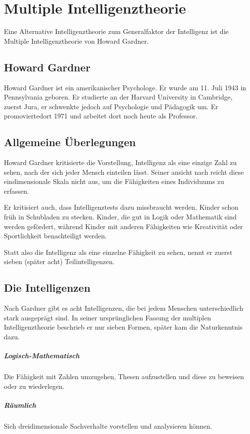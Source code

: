 \chapter{Multiple Intelligenztheorie}
Eine Alternative Intelligenztheorie zum Generalfaktor der Intelligenz ist die Multiple Intelligenztheorie von Howard Gardner.

\section{Howard Gardner}
Howard Gardner ist ein amerikanischer Psychologe. Er wurde am 11. Juli 1943 in Pennsylvania geboren. Er studierte an der Harvard University in Cambridge, zuerst Jura, er schwenkte jedoch auf Psychologie und Pädagogik um. Er promoviertedort 1971 und arbeitet dort noch heute als Professor.

\section{Allgemeine Überlegungen}
Howard Gardner kritisierte die Vorstellung, Intelligenz als eine einzige Zahl zu sehen, nach der sich jeder Mensch einteilen lässt. Seiner ansicht nach reicht diese eindimensionale Skala nicht aus, um die Fähigkeiten eines Individuums zu erfassen.

Er kritisiert auch, dass Intelligenztests dazu missbraucht werden, Kinder schon früh in \glqq Schubladen zu stecken\grqq{}. Kinder, die gut in Logik oder Mathematik sind werden gefördert, während Kinder mit anderen Fähigkeiten wie Kreativität oder Sportlichkeit benachteiligt werden.

Statt also die Intelligenz als eine einzelne Fähigkeit zu sehen, nennt er zuerst sieben (später acht) Teilintelligenzen.

\section{Die Intelligenzen}
Nach Gardner gibt es acht Intelligenzen, die bei jedem Menschen unterschiedlich stark ausgeprägt sind. In seiner ursprünglichen Fassung der multiplen Intelligenztheorie beschrieb er nur sieben Formen, später kam die Naturkenntnis dazu.
\paragraph{Logisch-Mathematisch}
Die Fähigkeit mit Zahlen umzugehen, Thesen aufzustellen und diese zu beweisen oder zu wiederlegen.
\paragraph{Räumlich}
Sich dreidimensionale Sachverhalte vorstellen und analysieren können.

